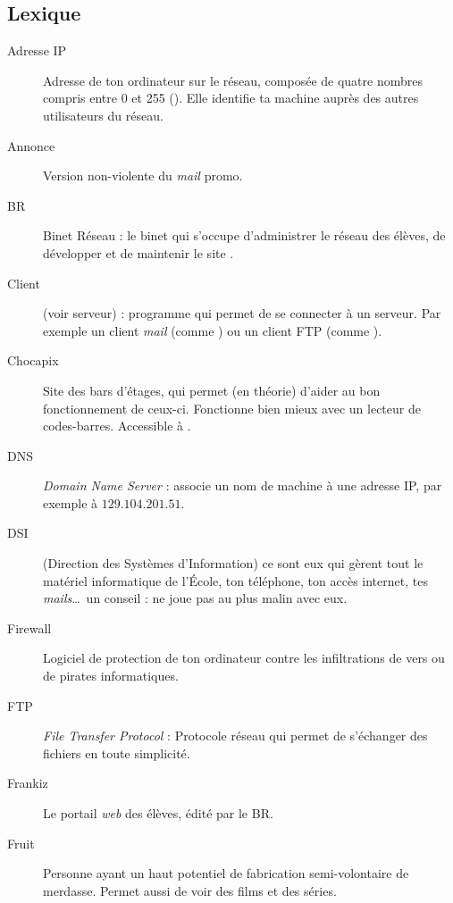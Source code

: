 \subsection{Lexique}


\begin{description}
  \item[Adresse IP] Adresse de ton ordinateur sur le réseau, composée de quatre nombres compris entre 0 et 255  (). Elle identifie ta machine auprès des autres utilisateurs du réseau.
  \item[Annonce] Version non-violente du \emph{mail} promo.
  
  \item[BR] Binet Réseau : le binet qui s'occupe d'administrer le réseau des élèves, de développer et de maintenir le site .

  \item[Client] (voir serveur) : programme qui permet de se connecter à un serveur. Par exemple un client \emph{mail}
	(comme ) ou un client FTP (comme ).
\item[Chocapix] Site des bars d'étages, qui permet (en théorie) d'aider au bon fonctionnement de ceux-ci. Fonctionne bien mieux avec un lecteur de codes-barres. Accessible à .
  \item[DNS] \emph{Domain Name Server} : associe un nom de machine à une adresse IP, par exemple  à  $129.104.201.51$.
  \item[DSI] (Direction des Systèmes d'Information) ce sont eux qui gèrent tout le matériel informatique de l'École, ton téléphone, ton accès internet, tes \emph{mails}\ldots\ un conseil : ne joue pas au plus malin avec eux.

  \item[Firewall] Logiciel de protection de ton ordinateur contre les infiltrations de vers ou de pirates informatiques.
  \item[FTP] \emph{File Transfer Protocol} : Protocole réseau qui permet de s'échanger des fichiers en toute simplicité.

  \item[Frankiz] Le portail \emph{web} des élèves, édité par le BR.
  \item[Fruit] Personne ayant un haut potentiel de fabrication semi-volontaire de merdasse. Permet aussi de voir des films et des séries.


\end{description}
